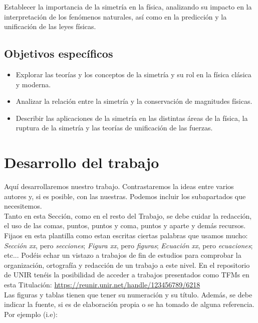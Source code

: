 \documentclass[11pt,a4paper,spanish]{book}
\begin{document}
Establecer la importancia de la simetría en la física, analizando su impacto en la interpretación de los fenómenos naturales, así como en la predicción y la unificación de las leyes físicas.


\section{Objetivos específicos}
\begin{itemize}
\item Explorar las teorías y los conceptos de la simetría y su rol en la física clásica y moderna.
\item Analizar la relación entre la simetría y la conservación de magnitudes físicas.
\item Describir las aplicaciones de la simetría en las distintas áreas de la física, la ruptura de la simetría y las teorías de unificación de las fuerzas.
\end{itemize}    

\chapter{Desarrollo del trabajo}

Aquí desarrollaremos nuestro trabajo. Contrastaremos la ideas entre varios autores y, si es posible, con las nuestras. Podemos incluir los subapartados que necesitemos.\\

Tanto en esta Sección, como en el resto del Trabajo, se debe cuidar la redacción, el uso de las comas, puntos, puntos y coma, puntos y aparte y demás recursos. Fijaos en esta plantilla como estan escritas ciertas palabras que usamos mucho: \emph{Sección xx}, pero \emph{secciones}; \emph{Figura xx}, pero \emph{figuras}; \emph{Ecuación xx}, pero \emph{ecuaciones}; etc... Podéis echar un vistazo a trabajos de fin de estudios para comprobar la organización, ortografía y redacción de un trabajo a este nivel. En el repositorio de UNIR tenéis la posibilidad de acceder a trabajos presentados como TFMs en esta Titulación: \url{https://reunir.unir.net/handle/123456789/6218}\\

Las figuras y tablas tienen que tener su numeración y su título. Además, se debe indicar la fuente, si es de elaboración propia o se ha tomado de alguna referencia.\\

Por ejemplo (i.e):
\end{document}
